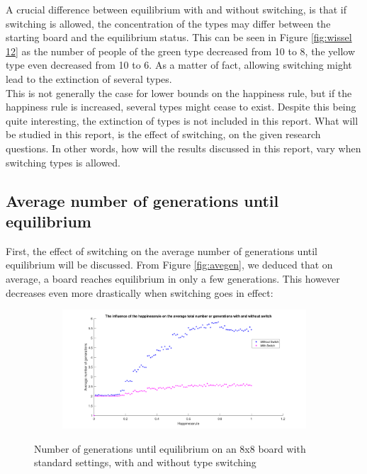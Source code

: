 A crucial difference between equilibrium with and without switching, is that if switching is allowed, the concentration of the types may differ between the starting board and the equilibrium status. 
This can be seen in Figure \ref{fig:wissel 12} as the number of people of the green type decreased from 10 to 8, the yellow type even decreased from 10 to 6. 
As a matter of fact, allowing switching might lead to the extinction of several types.\\

This is not generally the case for lower bounds on the happiness rule, but if the happiness rule is increased, several types might cease to exist. Despite this being quite interesting, the extinction of types is not included in this report.
What will be studied in this report, is the effect of switching, on the given research questions. In other words, how will the results discussed in this report, vary when switching types is allowed. 
\newpage

\subsection{Average number of generations until equilibrium}\label{subsec:avegensw}
First, the effect of switching on the average number of generations until equilibrium will be discussed. 
From Figure \ref{fig:avegen}, we deduced that on average, a board reaches equilibrium in only a few generations. This however decreases even more drastically when switching goes in effect:

\begin{figure}[H]
	\centering
    \begin{subfigure}{0.9\textwidth}
        \includegraphics[width=\textwidth]{happinessrule-totaantgenwithswitchorwithoutswitch}
    \end{subfigure}
    \caption{Number of generations until equilibrium on an 8x8 board with standard settings, with and without type switching}
    \label{fig:AantGenS}
\end{figure}

